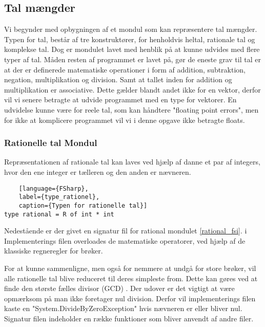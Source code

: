 \documentclass{article}
\begin{document}
\subsection{Tal mængder}
Vi begynder med opbygningen af et mondul som kan repræsentere tal mængder. Typen for tal, består af tre konstruktører, for henholdvis heltal, rationale tal og komplekse tal. Dog er mondulet lavet med henblik på at kunne udvides med flere typer af tal. Måden resten af programmet er lavet på, gør de eneste grav til tal er at der er definerede matematiske operationer i form af addition, subtraktion, negation, multiplikation og division. Samt at tallet inden for addition og multiplikation er associative. Dette gælder blandt andet ikke for en vektor, derfor vil vi senere betragte at udvide programmet med en type for vektorer. En udvidelse kunne være for reele tal, som kan håndtere "floating point errors", men for ikke at komplicere programmet vil vi i denne opgave ikke betragte floats.  

\subsubsection{Rationelle tal Mondul}
Repræsentationen af rationale tal kan laves ved hjælp af danne et par af integers, hvor den ene integer er tælleren og den anden er nævneren. 

\begin{lstlisting}
    [language={FSharp}, 
    label={type_rationel},
    caption={Typen for rationelle tal}]
type rational = R of int * int
\end{lstlisting}

Nedestående er der givet en signatur fil for rational mondulet \ref{rational_fsi}. i Implementerings filen overloades de matematiske operatorer, ved hjælp af de klassiske regneregler for brøker. 


For at kunne sammenligne, men også for nemmere at undgå for store brøker, vil alle rationelle tal blive reduceret til deres simpleste from. Dette kan gøres ved at finde den største fælles divisor (GCD) . Der udover er det vigtigt at være opmærksom på man ikke foretager nul division. Derfor vil implementerings filen kaste en "System.DivideByZeroException" hvis nævneren er eller bliver nul. Signatur filen indeholder en række funktioner som bliver anvendt af andre filer. 
 
\end{document}
